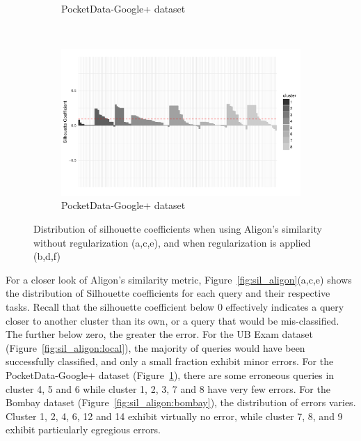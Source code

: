 \begin{figure}[h!]
\begin{subfigure}[b]{0.45\textwidth}
        \caption{PocketData-Google+ dataset}
        \label{fig:sil_aligon:googleplus}
    \end{subfigure}
    ~
    \begin{subfigure}[b]{0.45\textwidth}%
        \centering
        \includegraphics[width=\textwidth]{TKDE-QuerySimilarity/graphics/sil_googleplus_Aligon_regularization}
        \caption{PocketData-Google+ dataset}
        \label{fig:sil_aligon:googleplus_preprocess}
    \end{subfigure}
    \caption{Distribution of silhouette coefficients when using Aligon's similarity without regularization (a,c,e), and when regularization is applied (b,d,f)}
    \label{fig:sil_aligon}
    \label{fig:sil_aligon_preprocessed}
\end{figure}

For a closer look of Aligon's similarity metric, Figure~\ref{fig:sil_aligon}(a,c,e) shows the distribution of Silhouette coefficients for each query and their respective tasks.   
Recall that the silhouette coefficient below 0 effectively indicates a query closer to another cluster than its own, or a query that would be mis-classified.  The further below zero, the greater the error.  
For the UB Exam dataset (Figure~\ref{fig:sil_aligon:local}), the majority of queries would have been successfully classified, and only a small fraction exhibit minor errors.
For the PocketData-Google+ dataset (Figure~\ref{fig:sil_aligon:googleplus}), there are some erroneous queries in cluster 4, 5 and 6 while cluster 1, 2, 3, 7 and 8 have very few errors.
For the Bombay dataset (Figure~\ref{fig:sil_aligon:bombay}), the distribution of errors varies.  
Cluster 1, 2, 4, 6, 12 and 14 exhibit virtually no error, while cluster 7, 8, and 9 exhibit particularly egregious errors.


